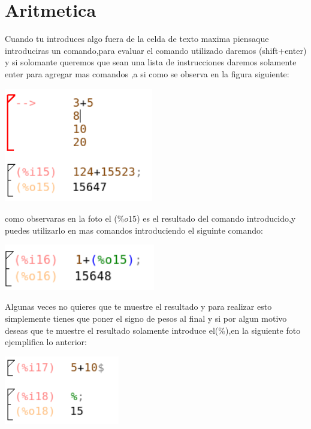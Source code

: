 \documentclass{article}
\begin{document}
\section{Aritmetica}

Cuando tu introduces algo fuera de la celda de texto maxima piensaque introduciras un comando,para evaluar el comando utilizado daremos (shift+enter) y si solomante queremos que sean una lista de instrucciones daremos solamente enter para agregar mas comandos ,a si como se observa en la figura siguiente:

\begin{center}
\includegraphics[height=5cm]{fto1.png}
\end{center}

como observaras en la foto el ($\%o15$) es el resultado del comando introducido,y puedes utilizarlo en mas comandos introduciendo el siguinte comando:

\begin{center}
\includegraphics[height=2cm]{fto2.png}
\end{center}

Algunas veces no quieres que te muestre el resultado y para realizar esto simplemente tienes que poner el signo de pesos al final y si por algun motivo deseas que te muestre el resultado solamente introduce el(\%),en la siguiente foto ejemplifica lo anterior:


\begin{center}
\includegraphics[height=3cm]{fto3.png}
\end{center}
\end{document}

